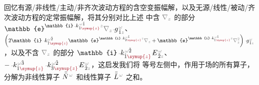 回忆有源/非线性/主动/非齐次波动方程的含空变振幅解，以及无源/线性/被动/齐次波动方程的定常振幅解，将其分别对比上述  中含 $\mathcolor{gray}{\nabla_z}$ 的部分 $\mathbb{e}^{\mathbb{i} \Xint{{}^{}_{\mathcolor{gray}{-}}}{10}{k}_{\hat{1} \textcolor{Maroon}{\symup{z}}}^{\;\! \mathcolor{gray}{\omega} \tilde{1}} \mathcolor{gray}{z}} \mathcolor{gray}{\nabla_z} \Xint{{}^{}_{\mathcolor{gray}{-}}}{10}{g}^{\;\!\mathcolor{gray}{\omega}}_{\;\! \tilde{1} \mathcolor{gray}{z}}$、$\left( 2 \mathbb{i} \Xint{\begin{smallmatrix} ~ \\ {}^{}_{\mathcolor{gray}{-}} \\ ~ \end{smallmatrix}}{15}{k}_{\hat{1} \textcolor{Maroon}{\symup{z}}}^{\;\! \mathcolor{gray}{\omega} \tilde{2}} \mathbb{e}^{\mathbb{i} \Xint{{}^{}_{\mathcolor{gray}{-}}}{10}{k}_{\tilde{2} \textcolor{Maroon}{\symup{z}}}^{\;\! \mathcolor{gray}{\omega} \tilde{1}} \mathcolor{gray}{z}} \mathcolor{gray}{\nabla_z} + \mathbb{e}^{\mathbb{i} \Xint{{}^{}_{\mathcolor{gray}{-}}}{10}{k}_{\hat{1} \textcolor{Maroon}{\symup{z}}}^{\;\! \mathcolor{gray}{\omega} \tilde{1}} \mathcolor{gray}{z}} \mathcolor{gray}{\nabla_z^2} \right) \Xint{{}^{}_{\mathcolor{gray}{-}}}{10}{g}^{\;\!\mathcolor{gray}{\omega}}_{\;\! \tilde{1} \mathcolor{gray}{z}}$，以及不含 $\mathcolor{gray}{\nabla_z}$ 的部分 $\mathbb{i} \Xint{\begin{smallmatrix} ~ \\ {}^{}_{\mathcolor{gray}{-}} \\ ~ \end{smallmatrix}}{15}{k}_{\hat{1} \textcolor{Maroon}{\symup{z}}}^{\;\! \mathcolor{gray}{\omega} \tilde{2}} \Xint{\mathcolor{gray}{-}}{25}{E}^{\;\!\mathcolor{gray}{\omega}}_{\;\! \tilde{2} \mathcolor{gray}{z}}$、$ - \Xint{\begin{smallmatrix} ~ \\ {}^{}_{\mathcolor{gray}{-}} \\ ~ \end{smallmatrix}}{15}{k}_{\hat{1} \textcolor{Maroon}{\symup{z}}}^{\;\! \mathcolor{gray}{\omega} \tilde{3}} \Xint{\begin{smallmatrix} ~ \\ {}^{}_{\mathcolor{gray}{-}} \\ ~ \end{smallmatrix}}{15}{k}_{\tilde{3} \textcolor{Maroon}{\symup{z}}}^{\;\! \mathcolor{gray}{\omega} \tilde{2}} \Xint{\mathcolor{gray}{-}}{25}{E}^{\;\!\mathcolor{gray}{\omega}}_{\;\! \tilde{2} \mathcolor{gray}{z}}$，这启发我们将  等号左侧中，作用于场的所有算子，分解为非线性算子 $\bar{\bar{N}}^{\;\! \mathcolor{gray}{\omega}}$ 和线性算子 $\bar{\bar{L}}^{\;\! \mathcolor{gray}{\omega}}$ 之和。

